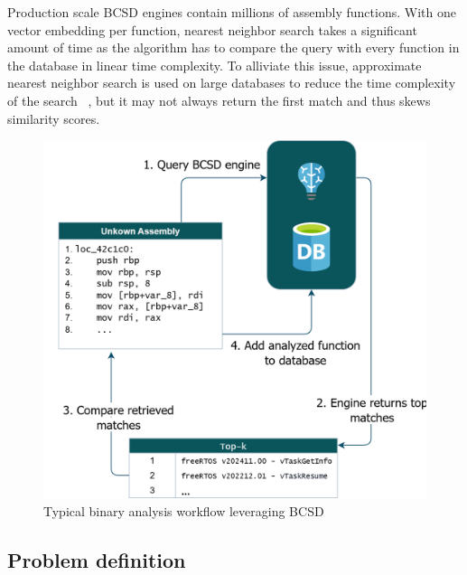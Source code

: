 \documentclass[conference,compsoc]{IEEEtran}
\begin{document}
Production scale BCSD engines contain millions of assembly functions. With one vector embedding per function, nearest neighbor
search takes a significant amount of time as the algorithm has to compare the query with every function in the database in linear
time complexity. To alliviate this issue, approximate nearest neighbor search is used on large databases to reduce the time
complexity of the search ~\cite{ANN,ANN-limits}, but it may not always return the first match and thus skews similarity scores.

\begin{figure}[t]
\centerline{\includegraphics[width=\linewidth]{BCSD-schematic}}
\caption{Typical binary analysis workflow leveraging BCSD}
\label{BCSD-workflow}
\end{figure}

\subsection{Problem definition}
\end{document}
